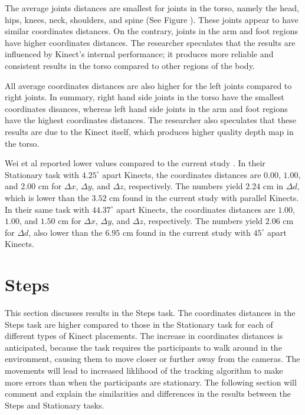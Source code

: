 The average joints distances are smallest for joints in the torso, namely the head, hips, knees, neck, shoulders, and spine (See Figure ). These joints appear to have similar coordinates distances. On the contrary, joints in the arm and foot regions have higher coordinates distances. The researcher speculates that the results are influenced by Kinect's internal performance; it produces more reliable and consistent results in the torso compared to other regions of the body.

All average coordinates distances are also higher for the left joints compared to right joints. In summary, right hand side joints in the torso have the smallest coordinates disances, whereas left hand side joints in the arm and foot regions have the highest coordinates distances. The researcher also speculates that these results are due to the Kinect itself, which produces higher quality depth map in the torso.

Wei et al reported lower values compared to the current study \cite{wei_kinect_calibration}. In their Stationary task with $4.25^{\circ}$ apart Kinects, the coordinates distances are $0.00$, $1.00$, and $2.00$ cm for $\Delta x$, $\Delta y$, and $\Delta z$, respectively. The numbers yield $2.24$ cm in $\Delta d$, which is lower than the $3.52$ cm found in the current study with parallel Kinects. In their same task with $44.37^{\circ}$ apart Kinects, the coordinates distances are $1.00$, $1.00$, and $1.50$ cm for $\Delta x$, $\Delta y$, and $\Delta z$, respectively. The numbers yield $2.06$ cm for $\Delta d$, also lower than the $6.95$ cm found in the current study with $45^{\circ}$ apart Kinects.

\section{Steps}
\label{sec:discussion_steps}

This section discusses results in the Steps task. The coordinates distances in the Steps task are higher compared to those in the Stationary task for each of different types of Kinect placements. The increase in coordinates distances is anticipated, because the task requires the participants to walk around in the environment, causing them to move closer or further away from the cameras. The movements will lead to increased liklihood of the tracking algorithm to make more errors than when the participants are stationary. The following section will comment and explain the similarities and differences in the results between the Steps and Stationary tasks.

